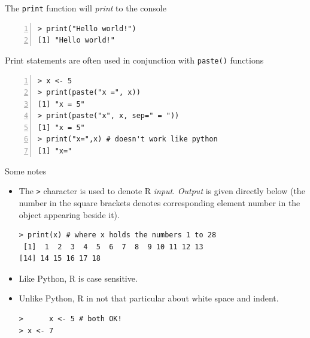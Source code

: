\documentclass[xcolor=svgnames, 10pt]{beamer}
\begin{document}
\begin{frame}[fragile]
The \texttt{print} function will \emph{print} to the console\\[2em]

\begin{Verbatim}[xleftmargin=2em, xrightmargin=1.5em, frame=single, numbers=left, label=print, framesep=0.5em]
> print("Hello world!")
[1] "Hello world!"
\end{Verbatim}
Print statements are often used in conjunction with {\tt paste()} functions\\[2em]

\begin{Verbatim}[xleftmargin=2em, xrightmargin=1.5em, frame=single, numbers=left, label=print and paste, framesep=0.5em]
> x <- 5
> print(paste("x =", x))
[1] "x = 5"
> print(paste("x", x, sep=" = "))
[1] "x = 5"
> print("x=",x) # doesn't work like python
[1] "x="
\end{Verbatim}
\end{frame}


\begin{frame}[fragile]{Some notes}
\begin{itemize}
\item The \verb|>| character is  used to denote R \textit{input}.  \textit{Output} is given directly below (the number in the square brackets denotes corresponding element number in the object appearing beside it).
\begin{Verbatim}
> print(x) # where x holds the numbers 1 to 28
 [1]  1  2  3  4  5  6  7  8  9 10 11 12 13
[14] 14 15 16 17 18 
\end{Verbatim}
\item Like Python, R is case sensitive.\nl
\item Unlike Python, R in not that particular about white space and indent.
\begin{Verbatim}
>      x <- 5 # both OK!
> x <- 7
\end{Verbatim}
\end{itemize}

\end{frame}
\end{document}

